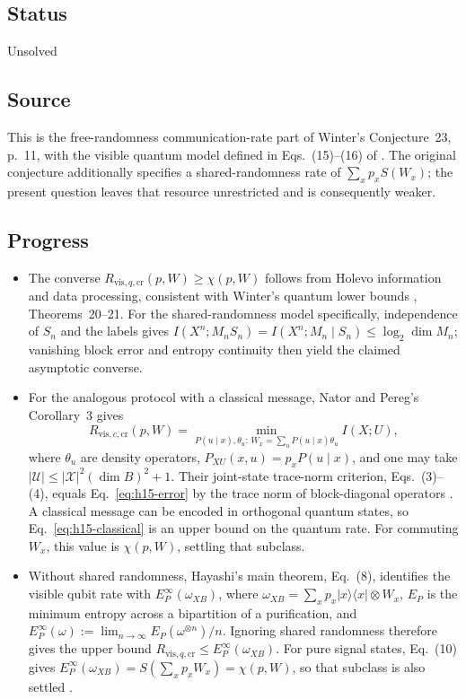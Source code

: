 \subsection*{Status}

Unsolved

\subsection*{Source}

This is the free-randomness communication-rate part of Winter's Conjecture~23, p.~11, with the visible quantum model defined in Eqs.~(15)--(16) of . The original conjecture additionally specifies a shared-randomness rate of $\sum_xp_xS(W_x)$; the present question leaves that resource unrestricted and is consequently weaker.

\subsection*{Progress}

\begin{itemize}
  \item The converse $R_{\mathrm{vis},q,\mathrm{cr}}(p,W)\ge\chi(p,W)$ follows from Holevo information and data processing, consistent with Winter's quantum lower bounds , Theorems~20--21. For the shared-randomness model specifically, independence of $S_n$ and the labels gives $I(X^n;M_nS_n)=I(X^n;M_n\mid S_n)\le\log_2\dim M_n$; vanishing block error and entropy continuity then yield the claimed asymptotic converse.

  \item For the analogous protocol with a classical message, Nator and Pereg's Corollary~3 gives
\begin{equation}
 R_{\mathrm{vis},c,\mathrm{cr}}(p,W)=\min_{P(u\mid x),\theta_u:\,W_x=\sum_uP(u\mid x)\theta_u}I(X;U),
 \label{eq:h15-classical}
\end{equation}
where $\theta_u$ are density operators, $P_{XU}(x,u)=p_xP(u\mid x)$, and one may take $|\mathcal U|\le |\mathcal X|^2(\dim B)^2+1$. Their joint-state trace-norm criterion, Eqs.~(3)--(4), equals Eq.~\eqref{eq:h15-error} by the trace norm of block-diagonal operators . A classical message can be encoded in orthogonal quantum states, so Eq.~\eqref{eq:h15-classical} is an upper bound on the quantum rate. For commuting $W_x$, this value is $\chi(p,W)$, settling that subclass.

  \item Without shared randomness, Hayashi's main theorem, Eq.~(8), identifies the visible qubit rate with $E_P^\infty(\omega_{XB})$, where $\omega_{XB}=\sum_xp_x|x\rangle\langle x|\otimes W_x$, $E_P$ is the minimum entropy across a bipartition of a purification, and $E_P^\infty(\omega):=\lim_{n\to\infty}E_P(\omega^{\otimes n})/n$. Ignoring shared randomness therefore gives the upper bound $R_{\mathrm{vis},q,\mathrm{cr}}\le E_P^\infty(\omega_{XB})$. For pure signal states, Eq.~(10) gives $E_P^\infty(\omega_{XB})=S(\sum_xp_xW_x)=\chi(p,W)$, so that subclass is also settled .
\end{itemize}

